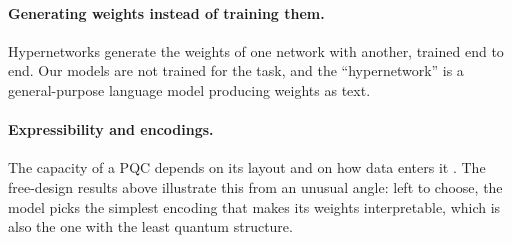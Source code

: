\paragraph{Generating weights instead of training them.}
Hypernetworks \citep{ha2017hypernetworks} generate the weights of one network with another, trained end to end. Our models are not trained for the task, and the ``hypernetwork'' is a general-purpose language model producing weights as text.

\paragraph{Expressibility and encodings.}
The capacity of a PQC depends on its layout \citep{sim2019expressibility} and on how data enters it \citep{schuld2021effect,havlivcek2019supervised}. The free-design results above illustrate this from an unusual angle: left to choose, the model picks the simplest encoding that makes its weights interpretable, which is also the one with the least quantum structure.
